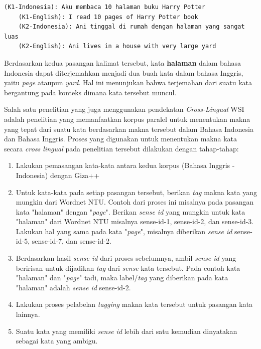 	\begin{lstlisting}[backgroundcolor = \color{white}]
	(K1-Indonesia): Aku membaca 10 halaman buku Harry Potter
	(K1-English): I read 10 pages of Harry Potter book
	(K2-Indonesia): Ani tinggal di rumah dengan halaman yang sangat luas
	(K2-English): Ani lives in a house with very large yard
	\end{lstlisting}
	
	Berdasarkan kedua pasangan kalimat tersebut, kata \textbf{halaman} dalam bahasa Indonesia dapat diterjemahkan menjadi dua buah kata dalam bahasa Inggris, yaitu \textit{page} ataupun \textit{yard}. Hal ini menunjukan bahwa terjemahan dari suatu kata bergantung pada konteks dimana kata tersebut muncul.
	
	Salah satu penelitian yang juga menggunakan pendekatan \textit{Cross-Lingual} WSI adalah penelitian \citep{septiantri2013wsd} yang memanfaatkan korpus paralel untuk menentukan makna yang tepat dari suatu kata berdasarkan makna tersebut dalam Bahasa Indonesia dan Bahasa Inggris. Proses yang digunakan untuk menentukan makna kata secara \textit{cross lingual} pada penelitian tersebut dilakukan dengan tahap-tahap:
	
	\begin{enumerate}
		\item Lakukan pemasangan kata-kata antara kedua korpus (Bahasa Inggris - Indonesia) dengan Giza++
		\item Untuk kata-kata pada setiap pasangan tersebut, berikan \textit{tag} makna kata yang mungkin dari Wordnet NTU. Contoh dari proses ini misalnya pada pasangan kata "halaman" dengan "\textit{page}". Berikan \textit{sense id} yang mungkin untuk kata "halaman" dari Wordnet NTU misalnya sense-id-1, sense-id-2, dan sense-id-3. Lakukan hal yang sama pada kata "\textit{page}", misalnya diberikan \textit{sense id} sense-id-5, sense-id-7, dan sense-id-2.
		\item Berdasarkan hasil \textit{sense id} dari proses sebelumnya, ambil \textit{sense id} yang beririsan untuk dijadikan \textit{tag} dari \textit{sense} kata tersebut. Pada contoh kata "halaman" dan "\textit{page}" tadi, maka label/\textit{tag} yang diberikan pada kata "halaman" adalah \textit{sense id} sense-id-2.
		\item Lakukan proses pelabelan \textit{tagging} makna kata tersebut untuk pasangan kata lainnya.
		\item Suatu kata yang memiliki \textit{sense id} lebih dari satu kemudian dinyatakan sebagai kata yang ambigu.
	\end{enumerate}


